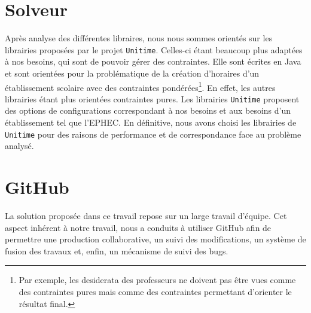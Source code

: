 \section{Solveur}

Après analyse des différentes libraires, nous nous sommes orientés sur les
librairies proposées par le projet \texttt{Unitime}. Celles-ci étant beaucoup plus adaptées à nos besoins, qui sont de pouvoir gérer des contraintes. 
\newline
\indent
Elle sont écrites en Java et sont orientées pour la problématique de la création d'horaires d'un établissement scolaire avec des contraintes pondérées\footnote{Par exemple, les desiderata des professeurs ne doivent pas être vues comme des contraintes pures mais comme des contraintes permettant d'orienter le résultat final.}. En effet, les autres librairies étant plus orientées contraintes pures.
\newline
\indent
Les librairies \texttt{Unitime} proposent des options de configurations correspondant à nos besoins et aux besoins d'un établissement tel que l'EPHEC. 
\newline
\indent
En définitive, nous avons choisi les librairies de \texttt{Unitime} pour des raisons de performance et de correspondance face au problème analysé.

\section{GitHub}

La solution proposée dans ce travail repose sur un large travail d'équipe. Cet aspect inhérent à notre travail, nous a conduits à utiliser GitHub afin de permettre une production collaborative, un suivi des modifications, un système de fusion des travaux et, enfin, un mécanisme de suivi des bugs. 



